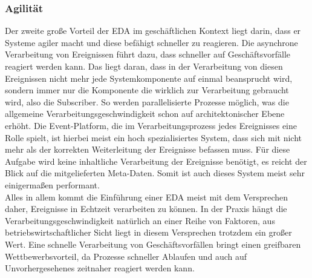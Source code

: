 \subsubsection*{Agilität}
Der zweite große Vorteil der \ac{EDA} im geschäftlichen Kontext liegt darin, dass er Systeme agiler macht und diese befähigt schneller zu reagieren. Die asynchrone Verarbeitung von Ereignissen führt dazu, dass schneller auf Geschäftsvorfälle reagiert werden kann. Das liegt daran, dass in der Verarbeitung von diesen Ereignissen nicht mehr jede Systemkomponente auf einmal beansprucht wird, sondern immer nur die Komponente die wirklich zur Verarbeitung gebraucht wird, also die Subscriber. So werden parallelisierte Prozesse möglich, was die allgemeine Verarbeitungsgeschwindigkeit schon auf architektonischer Ebene erhöht. Die Event-Platform, die im Verarbeitungsprozess jedes Ereignisses eine Rolle spielt, ist hierbei meist ein hoch spezialisiertes System, dass sich mit nicht mehr als der korrekten Weiterleitung der Ereignisse befassen muss. Für diese Aufgabe wird keine inhaltliche Verarbeitung der Ereignisse benötigt, es reicht der Blick auf die mitgelieferten Meta-Daten. Somit ist auch dieses System meist sehr einigermaßen performant. \\
Alles in allem kommt die Einführung einer \ac{EDA} meist mit dem Versprechen daher, Ereignisse in Echtzeit verarbeiten zu können. In der Praxis hängt die Verarbeitungsgeschwindigkeit natürlich an einer Reihe von Faktoren, aus betriebswirtschaftlicher Sicht liegt in diesem Versprechen trotzdem ein großer Wert. Eine schnelle Verarbeitung von Geschäftsvorfällen bringt einen greifbaren Wettbewerbsvorteil, da Prozesse schneller Ablaufen und auch auf Unvorhergesehenes zeitnaher reagiert werden kann.
